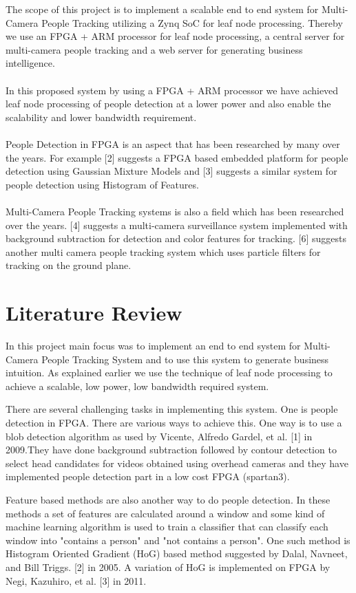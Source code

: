 \documentclass[12pt,a4paper]{report}
\begin{document}
The scope of this project is to implement a scalable end to end system for Multi-Camera People Tracking utilizing a Zynq SoC for leaf node processing. Thereby we use an FPGA + ARM processor for leaf node processing, a central server for multi-camera people tracking and a web server for generating business intelligence.\\\\
In this proposed system by using a FPGA + ARM processor we have achieved leaf node processing of people detection at a lower power and also enable the scalability and lower bandwidth requirement. \\\\
People Detection in FPGA is an aspect that has been researched by many over the
years. For example [2] suggests a FPGA based embedded platform for people detection using Gaussian Mixture Models and [3] suggests a similar system for people detection using Histogram of Features.\\\\
Multi-Camera People Tracking systems is also a field which has been researched over the years. [4] suggests a multi-camera surveillance system implemented with background subtraction for detection and color features for tracking. [6] suggests another multi camera people tracking system which uses particle filters for tracking on the ground plane.
\chapter{Literature Review}
In this project main focus was to implement an end to end system for Multi-Camera People Tracking System and to use this system to generate business intuition. As explained earlier we use the technique of leaf node processing to achieve a scalable, low power, low bandwidth required system.\vspace{0.3cm} 

There are several challenging tasks in implementing this system. One is people detection in FPGA. There are various ways to achieve this. One way is to use a blob detection algorithm as used by Vicente, Alfredo Gardel, et al. [1] in 2009.They have done background subtraction followed by contour detection to select head candidates for videos obtained using overhead cameras and they have implemented people detection part in a low cost FPGA (spartan3).\vspace{0.3cm}

Feature based methods are also another way to do people detection. In these methods a set of features are calculated around a window and some kind of machine learning algorithm is used to train a classifier that can classify each window into "contains a person" and "not contains a person". One such method is Histogram Oriented Gradient (HoG) based method suggested by Dalal, Navneet, and Bill Triggs. [2] in 2005. A variation of HoG is implemented on FPGA by Negi, Kazuhiro, et al. [3] in 2011.\vspace{0.3cm}
\end{document}
